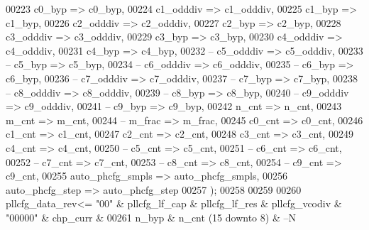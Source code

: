 \begin{DoxyCode}
00223         c0_byp          => c0_byp,
00224         c1_odddiv       => c1_odddiv,
00225         c1_byp          => c1_byp,
00226         c2_odddiv       => c2_odddiv,
00227         c2_byp          => c2_byp,
00228         c3_odddiv       => c3_odddiv,
00229         c3_byp          => c3_byp,
00230         c4_odddiv       => c4_odddiv,
00231         c4_byp          => c4_byp,
00232 \textcolor{keyword}{--      c5\_odddiv       => c5\_odddiv,}
00233 \textcolor{keyword}{--      c5\_byp          => c5\_byp,}
00234 \textcolor{keyword}{--      c6\_odddiv       => c6\_odddiv,}
00235 \textcolor{keyword}{--      c6\_byp          => c6\_byp,}
00236 \textcolor{keyword}{--      c7\_odddiv       => c7\_odddiv,}
00237 \textcolor{keyword}{--      c7\_byp          => c7\_byp,}
00238 \textcolor{keyword}{--      c8\_odddiv       => c8\_odddiv,}
00239 \textcolor{keyword}{--      c8\_byp          => c8\_byp,}
00240 \textcolor{keyword}{--      c9\_odddiv       => c9\_odddiv,}
00241 \textcolor{keyword}{--      c9\_byp          => c9\_byp,  }
00242         n_cnt               => n_cnt,
00243         m_cnt               => m_cnt,
00244 \textcolor{keyword}{--      m\_frac          => m\_frac,}
00245         c0_cnt          => c0_cnt,
00246         c1_cnt          => c1_cnt,
00247         c2_cnt          => c2_cnt,
00248         c3_cnt          => c3_cnt,
00249         c4_cnt          => c4_cnt,
00250 \textcolor{keyword}{--      c5\_cnt          => c5\_cnt, }
00251 \textcolor{keyword}{--      c6\_cnt          => c6\_cnt, }
00252 \textcolor{keyword}{--      c7\_cnt          => c7\_cnt,}
00253 \textcolor{keyword}{--      c8\_cnt          => c8\_cnt,}
00254 \textcolor{keyword}{--      c9\_cnt          => c9\_cnt,}
00255       auto_phcfg_smpls  => auto_phcfg_smpls,
00256       auto_phcfg_step   => auto_phcfg_step 
00257 \textcolor{vhdlchar}{)};
00258 
00259 
00260 \textcolor{vhdlchar}{pllcfg_data_rev}\textcolor{vhdlchar}{<=}         \textcolor{vhdllogic}{"00"} \textcolor{vhdlchar}{&} \textcolor{vhdlchar}{pllcfg_lf_cap} \textcolor{vhdlchar}{&} \textcolor{vhdlchar}{pllcfg_lf_res}  \textcolor{vhdlchar}{&} \textcolor{vhdlchar}{pllcfg_vcodiv}  \textcolor{vhdlchar}{&} \textcolor{vhdllogic}{"00000"} \textcolor{vhdlchar}{&} \textcolor{vhdlchar}{
      chp_curr} \textcolor{vhdlchar}{&}
00261                          \textcolor{vhdlchar}{n_byp}      \textcolor{vhdlchar}{&} \textcolor{vhdlchar}{n_cnt} \textcolor{vhdlchar}{(}\textcolor{vhdllogic}{}\textcolor{vhdllogic}{15}  \textcolor{keywordflow}{downto} \textcolor{vhdllogic}{}\textcolor{vhdllogic}{8}\textcolor{vhdlchar}{)} \textcolor{vhdlchar}{&}\textcolor{keyword}{ --N}

\end{DoxyCode}
